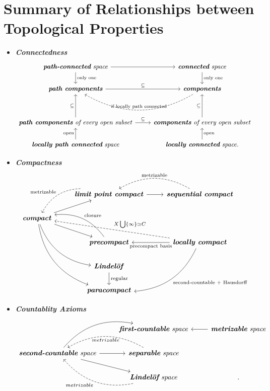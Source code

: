 \documentclass[11pt]{article}
\begin{document}
\section{Summary of Relationships between Topological Properties}
\begin{itemize}
\item  \emph{\textbf{Connectedness}}
\[
  \begin{tikzcd}
 \text{\emph{\textbf{path-connected} space}}  \arrow{d}{\text{only one}}   \arrow{r}{} &  \text{\emph{\textbf{connected} space}}  \arrow{d}{\text{only one}} \\
   \text{\emph{\textbf{path components}}}   \arrow{r}{\subseteq }  &\arrow[l, swap, bend left, dashed, "\text{if locally path connected}"]  \text{\emph{\textbf{components}}}\\
   & & \\
   \text{\emph{\textbf{path components} of every open subset}}   \arrow{r}{\subseteq } \arrow{uu}{\subseteq } & \text{\emph{\textbf{components}  of every open subset}} \arrow{uu}{\subseteq }\\
  \text{\emph{\textbf{locally path connected} space}} \arrow[u, "\text{open}"]  & \text{\emph{\textbf{locally connected} space}} \arrow[u, swap, "\text{open}"].
  \end{tikzcd}
\] 

\item  \emph{\textbf{Compactness}}
\[
  \begin{tikzcd}
   &  \arrow[dl, swap, bend right, dashed, "\text{metrizable}"]   \text{\emph{\textbf{limit point compact}}} \arrow{r}{} & \arrow[l, bend right, dashed, swap,  "\text{metrizable}"]  \text{\emph{\textbf{sequential compact}}}\\
  \text{\emph{\textbf{compact}}}  \arrow{ur}{}  \arrow{dr}{} \arrow[ddr, bend right] \arrow[dddr, bend right] & &\\
  & \arrow[bend right, swap]{ul}{\text{closure}}  \text{\emph{\textbf{precompact}}}    & \arrow{l}{\text{precompact basis}}   \text{\emph{\textbf{locally compact}}}  \arrow[ull,  dashed,  swap, "X \bigcup \set{\infty} \simeq C"]     \arrow[ddl,   bend left,  "\text{second-countable $+$ Hausdorff}"]  \\
 & \text{\emph{\textbf{Lindel{\"o}f}}} \arrow{d}{\text{regular}} & &\\
 & \text{\emph{\textbf{paracompact}}} &  &
  \end{tikzcd}
\] 

\item \emph{\textbf{Countablity Axioms}}
\[
  \begin{tikzcd}
     &  \text{\emph{\textbf{first-countable} space}} &\arrow{l}{} \text{\emph{\textbf{metrizable} space}}\\
   \text{\emph{\textbf{second-countable} space}}  \arrow[ur, bend left] \arrow{r}{} \arrow[dr]  & \arrow[l, bend right, dashed, "metrizable"] \text{\emph{\textbf{separable} space}} &\\
     &  \arrow[ul, dashed,  bend left,  "metrizable"] \text{\emph{\textbf{Lindel{\"o}f} space}}&.
  \end{tikzcd}
\] 



\end{itemize}
\end{document}
